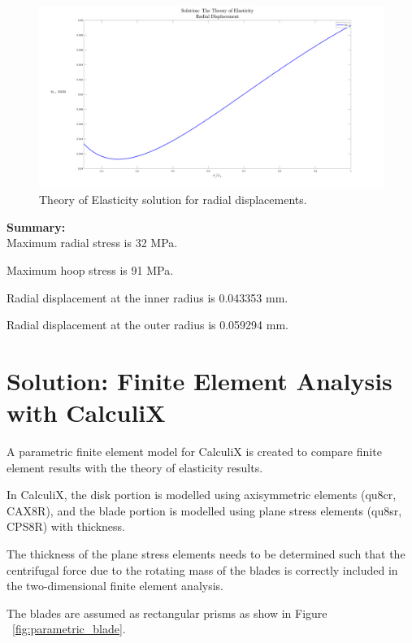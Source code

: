 \documentclass[12pt, a4paper, twoside]{article}
\begin{document}
\begin{figure}[h]
	\centering
	\includegraphics[scale=0.25]{analytical_solution_disp}
	\caption{Theory of Elasticity solution for radial displacements.}
	\label{fig:analytical_solution_disp}
\end{figure}

\clearpage

\textbf{Summary:}\\

Maximum radial stress is 32 MPa.

Maximum hoop stress is 91 MPa.

Radial displacement at the inner radius is 0.043353 mm.

Radial displacement at the outer radius is 0.059294 mm.



\section{\sloppy Solution: Finite Element Analysis with CalculiX}

A parametric finite element model for CalculiX \cite{CalculiX_website} is created to compare finite element results with the theory of elasticity results.

In CalculiX, the disk portion is modelled using axisymmetric elements (qu8cr, CAX8R), and the blade portion is modelled using plane stress elements (qu8sr, CPS8R) with thickness.

The thickness of the plane stress elements needs to be determined such that the centrifugal force due to the rotating mass of the blades is correctly included in the two-dimensional finite element analysis.

The blades are assumed as rectangular prisms as show in Figure ~\ref{fig:parametric_blade}.
\end{document}
